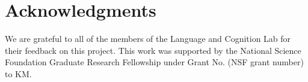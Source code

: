 \documentclass[10pt,letterpaper]{article}
\begin{document}
\section{Acknowledgments}

We are grateful to all of the members of the Language and Cognition Lab for their feedback on this project. This work was supported by the National Science Foundation Graduate Research Fellowship under Grant No. (NSF grant number) to KM.




\setlength{\bibleftmargin}{.125in}
\setlength{\bibindent}{-\bibleftmargin}


\end{document}

